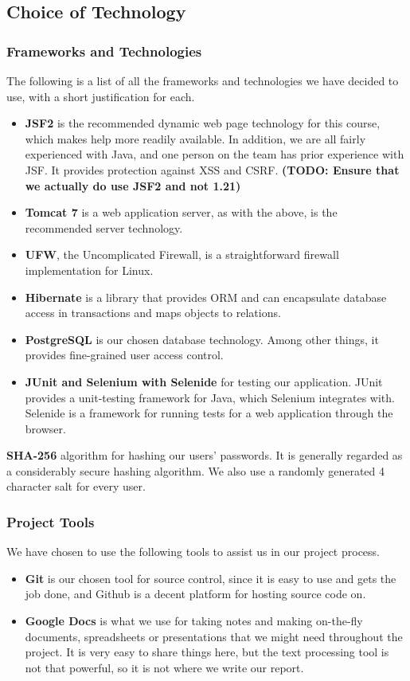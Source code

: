 \documentclass[a4paper]{article}
\begin{document}
\subsection{Choice of Technology}
\subsubsection{Frameworks and Technologies}
The following is a list of all the frameworks and technologies we have decided to use, with a short justification for each.
\begin{itemize}
\item \textbf{JSF2} is the recommended dynamic web page technology for this course, which makes help more readily available. In addition, we are all fairly experienced with Java, and one person on the team has prior experience with JSF. It provides protection against XSS and CSRF. \textbf{(TODO: Ensure that we actually do use JSF2 and not 1.21)}
\item \textbf{Tomcat 7} is a web application server, as with the above, is the recommended server technology.
\item \textbf{UFW}, the Uncomplicated Firewall, is a straightforward firewall implementation for Linux.
\item \textbf{Hibernate} is a library that provides ORM and can encapsulate database access in transactions and maps objects to relations.
\item \textbf{PostgreSQL} is our chosen database technology. Among other things, it provides fine-grained user access control.
\item \textbf{JUnit and Selenium with Selenide} for testing our application. JUnit provides a unit-testing framework for Java, which Selenium integrates with. Selenide is a framework for running tests for a web application through the browser.
\end{itemize}


\textbf{SHA-256} algorithm for hashing our users' passwords. It is generally regarded as a considerably secure hashing algorithm.
We also use a randomly generated 4 character salt for every user.

\subsubsection{Project Tools}
We have chosen to use the following tools to assist us in our project process.
\begin{itemize}
\item \textbf{Git} is our chosen tool for source control, since it is easy to use and gets the job done, and Github is a decent platform for hosting source code on.
\item \textbf{Google Docs} is what we use for taking notes and making on-the-fly documents, spreadsheets or presentations that we might need throughout the project. It is very easy to share things here, but the text processing tool is not that powerful, so it is not where we write our report.
\end{itemize}
\end{document}
